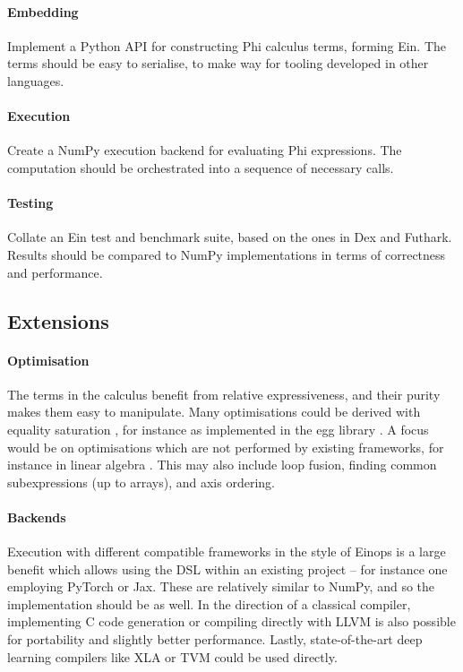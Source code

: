 \paragraph{Embedding} Implement a Python API for constructing Phi calculus terms, forming Ein. The terms should be easy to serialise, to make way for tooling developed in other languages.

\paragraph{Execution} Create a NumPy execution backend for evaluating Phi expressions. The computation should be orchestrated into a sequence of necessary calls.

\paragraph{Testing} Collate an Ein test and benchmark suite, based on the ones in Dex and Futhark. Results should be compared to NumPy implementations in terms of correctness and performance.

\subsection{Extensions}

\paragraph{Optimisation} The terms in the calculus benefit from relative expressiveness, and their purity makes them easy to manipulate. Many optimisations could be derived with equality saturation , for instance as implemented in the egg library . A focus would be on optimisations which are not performed by existing frameworks, for instance in linear algebra . This may also include loop fusion, finding common subexpressions (up to arrays), and axis ordering.

\paragraph{Backends} Execution with different compatible frameworks in the style of Einops \cite{rogozhnikov2021einops} is a large benefit which allows using the DSL within an existing project -- for instance one employing PyTorch or Jax. These are relatively similar to NumPy, and so the implementation should be as well. In the direction of a classical compiler, implementing C code generation or compiling directly with LLVM is also possible for portability and slightly better performance. Lastly, state-of-the-art deep learning compilers like XLA  or TVM  could be used directly.

